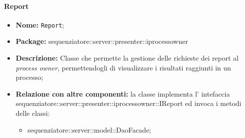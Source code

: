 \paragraph{Report}
	\begin{itemize}
		\item \textbf{Nome:} \texttt{Report};
		\item \textbf{Package:} sequenziatore::server::presenter::iprocessowner
		\item \textbf{Descrizione:} Classe che permette la gestione delle richieste dei report al \textit{process owner}, permettendogli di visualizzare i risultati raggiunti in un processo;
		\item \textbf{Relazione con altre componenti:} la classe implementa l' intefaccia sequenziatore::server::presenter::iprocessowner::IReport ed invoca i metodi delle classi:
		\begin{itemize}
			\item sequenziatore::server::model::DaoFacade;
		\end{itemize}
	\end{itemize}
